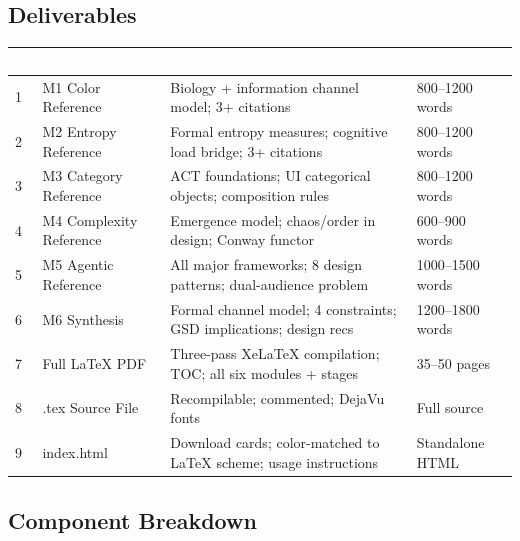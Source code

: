 \documentclass[11pt,letterpaper]{article}
\newcommand{\tableheader}[1]{\textbf{\sffamily\textcolor{white}{#1}}}
\begin{document}
\subsection{Deliverables}

\begin{center}
\begin{tabularx}{\textwidth}{C{0.5cm}L{4cm}L{4cm}X}
\toprule
{}
\tableheader{\#} & \tableheader{Deliverable} & \tableheader{Acceptance Criteria} & \tableheader{Spec} \\
 & M1 Color Reference & Biology + information channel model; 3+ citations & 800--1200 words \\
2 & M2 Entropy Reference & Formal entropy measures; cognitive load bridge; 3+ citations & 800--1200 words \\
3 & M3 Category Reference & ACT foundations; UI categorical objects; composition rules & 800--1200 words \\
4 & M4 Complexity Reference & Emergence model; chaos/order in design; Conway functor & 600--900 words \\
5 & M5 Agentic Reference & All major frameworks; 8 design patterns; dual-audience problem & 1000--1500 words \\
6 & M6 Synthesis & Formal channel model; 4 constraints; GSD implications; design recs & 1200--1800 words \\
7 & Full LaTeX PDF & Three-pass XeLaTeX compilation; TOC; all six modules + stages & 35--50 pages \\
8 & .tex Source File & Recompilable; commented; DejaVu fonts & Full source \\
9 & index.html & Download cards; color-matched to LaTeX scheme; usage instructions & Standalone HTML \\
\bottomrule
\end{tabularx}
\end{center}

\subsection{Component Breakdown}
\end{document}
